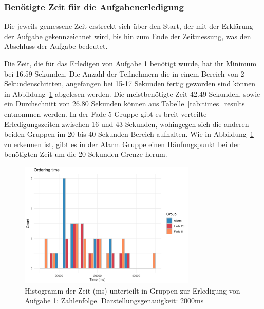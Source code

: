 \subsubsection{Benötigte Zeit für die Aufgabenerledigung}

Die jeweils gemessene Zeit erstreckt sich über den Start, der mit der Erklärung der Aufgabe gekennzeichnet wird, bis hin zum Ende der Zeitmessung, was den Abschluss der Aufgabe bedeutet.

Die Zeit, die für das Erledigen von Aufgabe 1 benötigt wurde, hat ihr Minimum bei 16.59 Sekunden. Die Anzahl der Teilnehmern die in einem Bereich von 2-Sekundenschritten, angefangen bei 15-17 Sekunden fertig geworden sind können in Abbildung~\ref{fig:orderingTimeHistogram} abgelesen werden. Die meistbenötigte Zeit 42.49 Sekunden, sowie ein Durchschnitt von 26.80 Sekunden können aus Tabelle~\ref{tab:times_results} entnommen werden.
In der Fade 5 Gruppe gibt es breit verteilte Erledigungszeiten zwischen 16 und 43 Sekunden, wohingegen sich die anderen beiden Gruppen im 20 bis 40 Sekunden Bereich aufhalten. Wie in Abbildung~\ref{fig:orderingTimeHistogram} zu erkennen ist, gibt es in der Alarm Gruppe einen Häufungspunkt bei der benötigten Zeit um die 20 Sekunden Grenze herum.

\begin{figure}[H]
	\centering
	\includegraphics[width=0.75\textwidth]{./_StudyResults/orderingTimeHist}
	\caption{Histogramm der Zeit (ms) unterteilt in Gruppen zur Erledigung von Aufgabe 1: Zahlenfolge. Darstellungsgenauigkeit: 2000ms}
	\label{fig:orderingTimeHistogram}
\end{figure}

